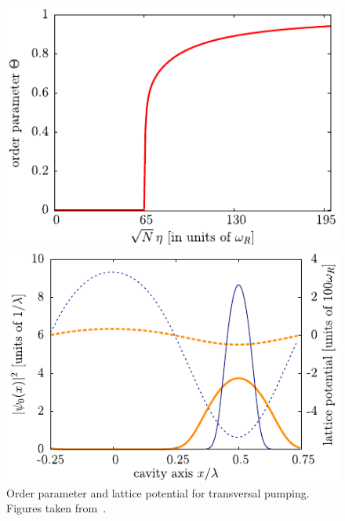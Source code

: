\begin{figure}[!htb]
	\begin{minipage}[b]{.5\linewidth}
	\centering
	\includegraphics[width=1\linewidth]{images/order-parameter.pdf}
	\end{minipage}
%
	\begin{minipage}[b]{.5\linewidth}
	\centering
	\includegraphics[width=1\linewidth]{images/lattice-potential.pdf}
	\end{minipage}
\caption{Order parameter and lattice potential for transversal pumping. Figures taken from~\cite{Nagy2008}.}
\label{fig:self-organization}
\end{figure}
\FloatBarrier